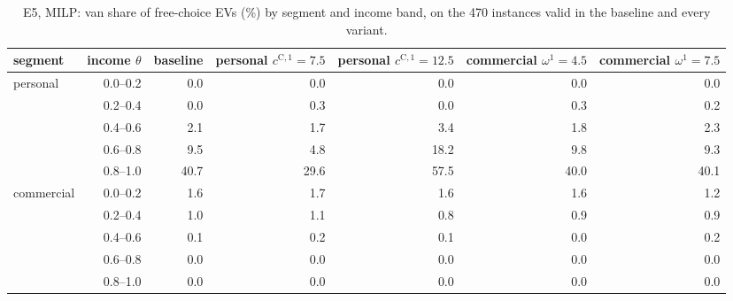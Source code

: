 \begin{table}[H]\centering
\small
\caption{E5, MILP: van share of free-choice EVs (\%) by segment and income band, on the 470 instances valid in the baseline and every variant.}\label{tab:bandE5}
\begin{adjustbox}{max width=\textwidth}\begin{tabular}{lrrrrrr}\toprule
segment & income $\theta$ & baseline & personal $c^{\mathrm C,1}=7.5$ & personal $c^{\mathrm C,1}=12.5$ & commercial $\omega^{1}=4.5$ & commercial $\omega^{1}=7.5$ \\ \midrule
personal & 0.0--0.2 & 0.0 & 0.0 & 0.0 & 0.0 & 0.0 \\
 & 0.2--0.4 & 0.0 & 0.3 & 0.0 & 0.3 & 0.2 \\
 & 0.4--0.6 & 2.1 & 1.7 & 3.4 & 1.8 & 2.3 \\
 & 0.6--0.8 & 9.5 & 4.8 & 18.2 & 9.8 & 9.3 \\
 & 0.8--1.0 & 40.7 & 29.6 & 57.5 & 40.0 & 40.1 \\
commercial & 0.0--0.2 & 1.6 & 1.7 & 1.6 & 1.6 & 1.2 \\
 & 0.2--0.4 & 1.0 & 1.1 & 0.8 & 0.9 & 0.9 \\
 & 0.4--0.6 & 0.1 & 0.2 & 0.1 & 0.0 & 0.2 \\
 & 0.6--0.8 & 0.0 & 0.0 & 0.0 & 0.0 & 0.0 \\
 & 0.8--1.0 & 0.0 & 0.0 & 0.0 & 0.0 & 0.0 \\
\bottomrule\end{tabular}\end{adjustbox}\end{table}
